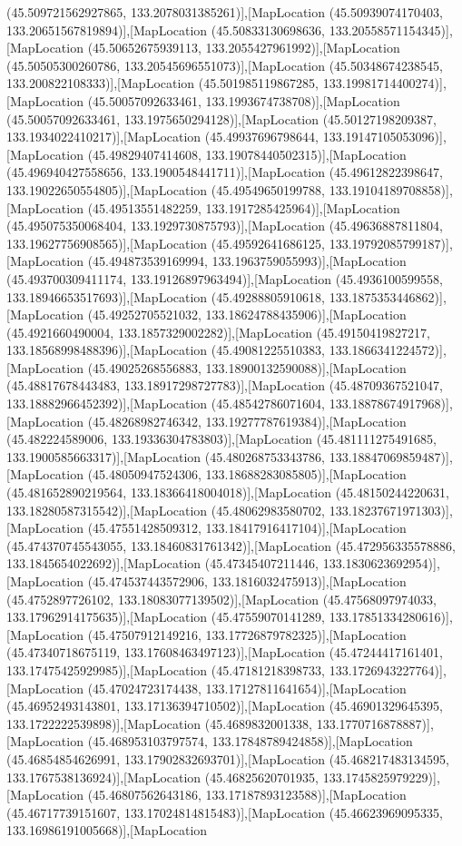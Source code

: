 (45.509721562927865, 133.2078031385261)],[MapLocation (45.50939074170403, 133.20651567819894)],[MapLocation (45.50833130698636, 133.20558571154345)],[MapLocation (45.50652675939113, 133.2055427961992)],[MapLocation (45.50505300260786, 133.20545696551073)],[MapLocation (45.50348674238545, 133.200822108333)],[MapLocation (45.501985119867285, 133.19981714400274)],[MapLocation (45.50057092633461, 133.1993674738708)],[MapLocation (45.50057092633461, 133.1975650294128)],[MapLocation (45.50127198209387, 133.1934022410217)],[MapLocation (45.49937696798644, 133.19147105053096)],[MapLocation (45.49829407414608, 133.19078440502315)],[MapLocation (45.496940427558656, 133.1900548441711)],[MapLocation (45.49612822398647, 133.19022650554805)],[MapLocation (45.49549650199788, 133.19104189708858)],[MapLocation (45.49513551482259, 133.1917285425964)],[MapLocation (45.495075350068404, 133.1929730875793)],[MapLocation (45.49636887811804, 133.19627756908565)],[MapLocation (45.49592641686125, 133.19792085799187)],[MapLocation (45.494873539169994, 133.1963759055993)],[MapLocation (45.493700309411174, 133.19126897963494)],[MapLocation (45.4936100599558, 133.18946653517693)],[MapLocation (45.49288805910618, 133.1875353446862)],[MapLocation (45.49252705521032, 133.18624788435906)],[MapLocation (45.4921660490004, 133.1857329002282)],[MapLocation (45.49150419827217, 133.18568998488396)],[MapLocation (45.49081225510383, 133.1866341224572)],[MapLocation (45.49025268556883, 133.18900132590088)],[MapLocation (45.48817678443483, 133.18917298727783)],[MapLocation (45.48709367521047, 133.18882966452392)],[MapLocation (45.48542786071604, 133.18878674917968)],[MapLocation (45.48268982746342, 133.19277787619384)],[MapLocation (45.482224589006, 133.19336304783803)],[MapLocation (45.481111275491685, 133.1900585663317)],[MapLocation (45.480268753343786, 133.18847069859487)],[MapLocation (45.48050947524306, 133.18688283085805)],[MapLocation (45.481652890219564, 133.18366418004018)],[MapLocation (45.48150244220631, 133.18280587315542)],[MapLocation (45.48062983580702, 133.18237671971303)],[MapLocation (45.47551428509312, 133.18417916417104)],[MapLocation (45.474370745543055, 133.18460831761342)],[MapLocation (45.472956335578886, 133.1845654022692)],[MapLocation (45.47345407211446, 133.1830623692954)],[MapLocation (45.474537443572906, 133.1816032475913)],[MapLocation (45.4752897726102, 133.18083077139502)],[MapLocation (45.47568097974033, 133.17962914175635)],[MapLocation (45.47559070141289, 133.17851334280616)],[MapLocation (45.47507912149216, 133.17726879782325)],[MapLocation (45.47340718675119, 133.17608463497123)],[MapLocation (45.47244417161401, 133.17475425929985)],[MapLocation (45.47181218398733, 133.1726943227764)],[MapLocation (45.47024723174438, 133.17127811641654)],[MapLocation (45.46952493143801, 133.17136394710502)],[MapLocation (45.46901329645395, 133.1722222539898)],[MapLocation (45.4689832001338, 133.1770716878887)],[MapLocation (45.468953103797574, 133.17848789424858)],[MapLocation (45.46854854626991, 133.17902832693701)],[MapLocation (45.468217483134595, 133.1767538136924)],[MapLocation (45.46825620701935, 133.1745825979229)],[MapLocation (45.46807562643186, 133.17187893123588)],[MapLocation (45.46717739151607, 133.17024814815483)],[MapLocation (45.46623969095335, 133.16986191005668)],[MapLocation 
